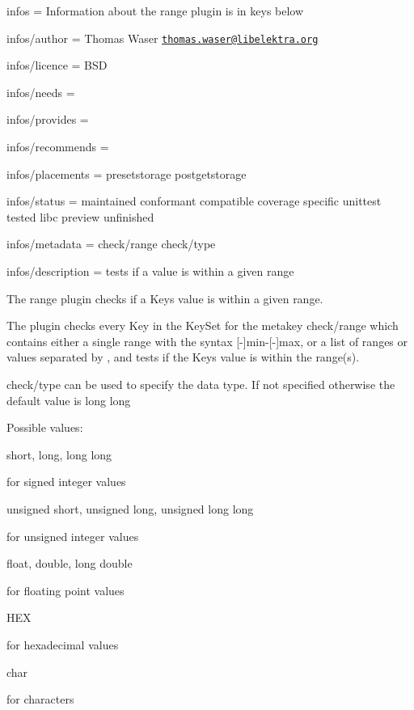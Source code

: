 
\begin{DoxyItemize}
\item infos = Information about the range plugin is in keys below
\item infos/author = Thomas Waser \href{mailto:thomas.waser@libelektra.org}{\tt thomas.\+waser@libelektra.\+org}
\item infos/licence = B\+SD
\item infos/needs =
\item infos/provides =
\item infos/recommends =
\item infos/placements = presetstorage postgetstorage
\item infos/status = maintained conformant compatible coverage specific unittest tested libc preview unfinished
\item infos/metadata = check/range check/type
\item infos/description = tests if a value is within a given range
\end{DoxyItemize}

The range plugin checks if a {\ttfamily Key}\textquotesingle{}s value is within a given range.

The plugin checks every {\ttfamily Key} in the {\ttfamily Key\+Set} for the metakey {\ttfamily check/range} which contains either a single range with the syntax {\ttfamily \mbox{[}-\/\mbox{]}min-\/\mbox{[}-\/\mbox{]}max}, or a list of ranges or values separated by {\ttfamily ,} and tests if the {\ttfamily Key}\textquotesingle{}s value is within the range(s).

{\ttfamily check/type} can be used to specify the data type. If not specified otherwise the default value is {\ttfamily long long}

Possible values\+:


\begin{DoxyItemize}
\item {\ttfamily short}, {\ttfamily long}, {\ttfamily long long}

for signed integer values
\item {\ttfamily unsigned short}, {\ttfamily unsigned long}, {\ttfamily unsigned long long}

for unsigned integer values
\item {\ttfamily float}, {\ttfamily double}, {\ttfamily long double}

for floating point values
\item {\ttfamily H\+EX}

for hexadecimal values
\item {\ttfamily char}

for characters
\end{DoxyItemize}

